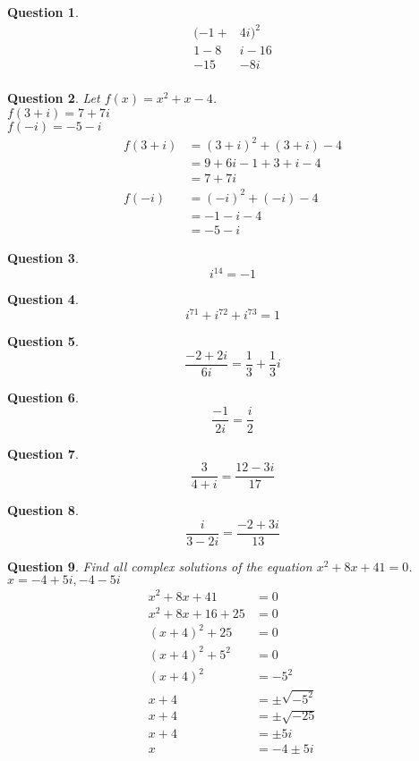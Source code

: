\documentclass{amsart}
\newtheorem{question}{Question}
\begin{document}
	\begin{question}
		\[\begin{aligned}
			(-1+&4i)^2\\
			1-8&i-16\\
			-15&-8i\\
		\end{aligned}\]
	\end{question}
	\newpage
	\begin{question}
		Let $f(x)=x^2+x-4$.\\
		$f(3+i)=\boxed{7+7i}$\\
		$f(-i)=\boxed{-5-i}$\\
		\[\begin{aligned}
			f(3+i)&=(3+i)^2+(3+i)-4\\
			&=9+6i-1+3+i-4\\
			&=7+7i\\
			f(-i)&=(-i)^2+(-i)-4\\
			&=-1-i-4\\
			&=-5-i
		\end{aligned}\]
	\end{question}
	\begin{question}
		\[i^{14}=-1\]
	\end{question}
	\begin{question}
		\[i^{71}+i^{72}+i^{73}=1\]
	\end{question}
	\begin{question}
		\[\frac{-2+2i}{6i}=\frac{1}{3}+\frac{1}{3}i\]
	\end{question}
	\begin{question}
		\[\frac{-1}{2i}=\frac{i}{2}\]
	\end{question}
	\begin{question}
		\[\frac{3}{4+i}=\frac{12-3i}{17}\]
	\end{question}
	\begin{question}
		\[\frac{i}{3-2i}=\frac{-2+3i}{13}\]
	\end{question}
	\begin{question}
		Find all complex solutions of the equation
		$x^2+8x+41=0$.\\
		$x=\boxed{-4+5i,-4-5i}$
		\[\begin{aligned}
			x^2+8x+41&=0\\
			x^2+8x+16+25&=0\\
			(x+4)^2+25&=0\\
			(x+4)^2+5^2&=0\\
			(x+4)^2&=-5^2\\
			x+4&=\pm\sqrt{-5^2}\\
			x+4&=\pm\sqrt{-25}\\
			x+4&=\pm5i\\
			x&=-4\pm5i\\
		\end{aligned}\]
	\end{question}
\end{document}
